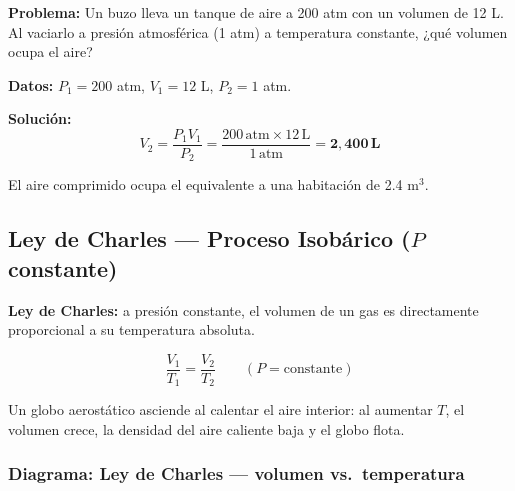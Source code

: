\begin{seccion}
\textbf{Problema:} Un buzo lleva un tanque de aire a 200 atm con un volumen de 12 L. Al vaciarlo a presión atmosférica (1 atm) a temperatura constante, ¿qué volumen ocupa el aire?

\textbf{Datos:} $P_1 = 200$ atm, $V_1 = 12$ L, $P_2 = 1$ atm.

\textbf{Solución:}
$$V_2 = \frac{P_1 V_1}{P_2} = \frac{200\,\text{atm} \times 12\,\text{L}}{1\,\text{atm}} = \mathbf{2{,}400\,\text{L}}$$

El aire comprimido ocupa el equivalente a una habitación de 2.4 m$^3$.
\end{seccion}

\subsection{Ley de Charles --- Proceso Isobárico ($P$ constante)}

\begin{seccion}
\begin{definicion}
\textbf{Ley de Charles:} a presión constante, el volumen de un gas es directamente proporcional a su temperatura absoluta.
\end{definicion}

\begin{ecuacion}
$$\frac{V_1}{T_1} = \frac{V_2}{T_2} \qquad (P = \text{constante})$$
\end{ecuacion}

Un globo aerostático asciende al calentar el aire interior: al aumentar $T$, el volumen crece, la densidad del aire caliente baja y el globo flota.
\end{seccion}

\subsubsection{Diagrama: Ley de Charles --- volumen vs.\ temperatura}

